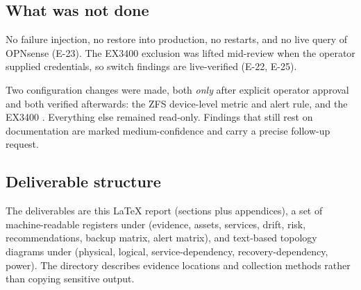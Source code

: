 \subsection{What was not done}

No failure injection, no restore into production, no restarts, and no live query of
OPNsense (E-23). The EX3400 exclusion was lifted mid-review when the operator supplied
credentials, so switch findings are live-verified (E-22, E-25).

Two configuration changes were made, both \emph{only} after explicit operator approval and
both verified afterwards: the ZFS device-level metric and alert rule, and the EX3400
. Everything else remained read-only. Findings that still rest on
documentation are marked medium-confidence and carry a precise follow-up request.

\subsection{Deliverable structure}

The deliverables are this LaTeX report (sections plus appendices), a set of
machine-readable registers under  (evidence, assets, services, drift,
risk, recommendations, backup matrix, alert matrix), and text-based topology
diagrams under  (physical, logical, service-dependency,
recovery-dependency, power). The  directory describes evidence
locations and collection methods rather than copying sensitive output.
